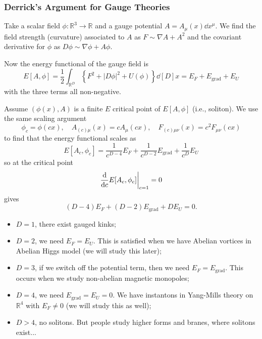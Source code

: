 \documentclass[a4paper,11pt]{article}
\begin{document}
    \subsubsection{Derrick's Argument for Gauge Theories}

    Take a scalar field $\phi : \mathbb{R}^3 \to \mathbb{R}$ and a gauge potential $A = A_\mu(x) \dd{x^\mu}$. We find the field strength (curvature) associated to $A$ as $F \sim \nabla A + A^2$ and the covariant derivative for $\phi$ as $D \phi \sim \nabla \phi + A \phi$.
    
    Now the energy functional of the gauge field is 
    \begin{equation}
        E[A, \phi] = \frac{1}{2} \int_{\mathbb{R}^D} \left\{ F^2 + |D \phi|^2 + U(\phi) \right\} \dd[D]{x} = E_F + E_\text{grad} + E_U
    \end{equation}
    with the three terms all non-negative.

    Assume $(\phi(x), A)$ is a finite $E$ critical point of $E[A, \phi]$ (i.e., soliton). We use the same scaling argument 
    \begin{equation}
        \phi_c = \phi(c x), \quad A_{(c) \mu}(x) = c A_{\mu}(c x), \quad F_{(c) \mu \nu}(x) = c^2 F_{\mu \nu}(c x)
    \end{equation}
    to find that the energy functional scales as 
    \begin{equation}
        E[A_c, \phi_c ] = \frac{1}{c^{D-4}} E_F + \frac{1}{c^{D-2}} E_{\text{grad}} + \frac{1}{c^D} E_U
    \end{equation}
    so at the critical point
    \begin{equation}
        \dv{c} E[A_c, \phi_c] \bigg|_{c=1} = 0 
    \end{equation}
    gives 
    \begin{equation}
        (D-4)E_F + (D-2) E_\text{grad} + D E_U = 0.
    \end{equation}

    \begin{itemize}
        \item $D=1$, there exist gauged kinks;
        \item $D=2$, we need $E_F = E_U$. This is satisfied when we have Abelian vortices in Abelian Higgs model (we will study this later); 
        \item $D=3$, if we switch off the potential term, then we need $E_F = E_\text{grad}$. This occurs when we study non-abelian magnetic monopoles;
        \item $D=4$, we need $E_\text{grad} = E_U = 0$. We have instantons in Yang-Mills theory on $\mathbb{R}^4$ with $E_F \neq 0$ (we will study this as well);
        \item $D > 4$, no solitons. But people study higher forms and branes, where solitons exist...
    \end{itemize}
    \newpage
\end{document}
